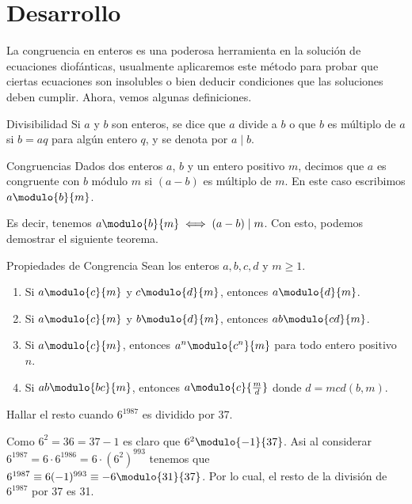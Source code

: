 \section{Desarrollo}

La congruencia en enteros es una poderosa herramienta en la solución de ecuaciones diofánticas, usualmente aplicaremos
este método para probar que ciertas ecuaciones son insolubles o bien deducir condiciones que las soluciones deben cumplir.
Ahora, vemos algunas definiciones.

\begin{definition.box}{Divisibilidad}{}
    Si $a$ y $b$ son enteros, se dice que $a$ divide a $b$ o que $b$ es múltiplo de $a$ si $b = aq$ para algún entero $q$,
    y se denota por $a \mid b$.
\end{definition.box}

\begin{definition.box}{Congruencias}{}
    Dados dos enteros $a$, $b$ y un entero positivo $m$, decimos que $a$ es congruente con $b$ módulo $m$ si $(a - b)$ es múltiplo de $m$.
    En este caso escribimos $a \modulo{b}{m}$.
\end{definition.box}
Es decir, tenemos $a \modulo{b}{m} \iff (a - b) \mid m$.
Con esto, podemos demostrar el siguiente teorema.

\begin{theorem.box}{Propiedades de Congrencia}{}
    Sean los enteros $a,b,c,d$ y $m \geq 1$.
    \begin{enumerate}
        \item Si $a \modulo{c}{m}$ y $c \modulo{d}{m}$, entonces $a \modulo{d}{m}$.
        \item Si $a \modulo{c}{m}$ y $b \modulo{d}{m}$, entonces $ab \modulo{cd}{m}$.
        \item Si $a \modulo{c}{m}$, entonces $a^n \modulo{c^n}{m}$ para todo entero positivo $n$.
        \item Si $ab \modulo{bc}{m}$, entonces $a \modulo{c}{\frac{m}{d}}$ donde $d = mcd(b,m)$.
    \end{enumerate}
\end{theorem.box}

\begin{example}
    Hallar el resto cuando $6^{1987}$ es dividido por 37.
\end{example}
\begin{solution}
    Como $6^2 = 36 = 37 - 1$ es claro que $6^2 \modulo{-1}{37}$.
    Asi al considerar $6^{1987} = 6\cdot 6^{1986} = 6\cdot (6^2)^{993}$ tenemos que $6^{1987} \equiv 6(-1)^{993} \equiv -6 \modulo{31}{37}$.
    Por lo cual, el resto de la división de $6^{1987}$ por 37 es 31.
\end{solution}


